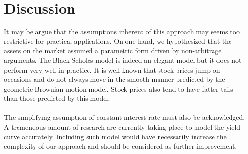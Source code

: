 \documentclass{article}
\theoremstyle{definition}
\theoremstyle{remark}
\newcommand{\measure}[1]{\ensuremath{\mathbb{#1}}}
\begin{document}












\newpage
\section{Discussion}




It may be argue that the assumptions inherent of this approach may seems too restrictive for practical applications. On one hand, we hypothesized that the assets on the market assumed a parametric form driven by non-arbitrage arguments. The Black-Scholes model is indeed an elegant model but it does not perform very well in practice. It is well known that stock prices jump on occasions and do not always move in the smooth manner predicted by the geometric Brownian motion model. Stock prices also tend to have fatter tails than those predicted by this model.\\
\\
The simplifying assumption of constant interest rate must also be acknowledged. A tremendous amount of research are currently taking place to model the yield curve accurately. Including such model would have necessarily increase the complexity of our approach and should be considered as further improvement.
\\
\end{document}
